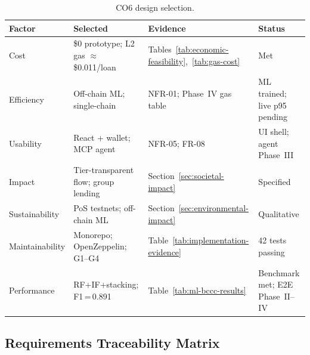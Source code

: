 \documentclass[12pt,a4paper]{report}
\newcommand{\tableheadcolor}{\rowcolor{TableHeadBg}}
\begin{document}
\begin{table}[H]
\centering
\caption[CO6 design selection]{CO6 design selection.}
\label{tab:co6-selection-summary}
\small
\begin{tabular}{@{}p{2.2cm}p{3.6cm}p{4.0cm}p{4.4cm}@{}}
\toprule
\tableheadcolor
\textbf{Factor} & \textbf{Selected} & \textbf{Evidence} & \textbf{Status} \\
\midrule
Cost & \$0 prototype; L2 gas ${\approx}$\$0.011/loan & Tables~\ref{tab:economic-feasibility},~\ref{tab:gas-cost} & Met \\
Efficiency & Off-chain ML; single-chain & NFR-01; Phase~IV gas table & ML trained; live p95 pending \\
Usability & React + wallet; MCP agent & NFR-05; FR-08 & UI shell; agent Phase~III \\
Impact & Tier-transparent flow; group lending & Section~\ref{sec:societal-impact} & Specified \\
Sustainability & PoS testnets; off-chain ML & Section~\ref{sec:environmental-impact} & Qualitative \\
Maintainability & Monorepo; OpenZeppelin; G1--G4 & Table~\ref{tab:implementation-evidence} & 42 tests passing \\
Performance & RF+IF+stacking; F1\,=\,0.891 & Table~\ref{tab:ml-bccc-results} & Benchmark met; E2E Phase~II--IV \\
\bottomrule
\end{tabular}
\end{table}

\subsection{Requirements Traceability Matrix}
\label{sec:traceability}
\end{document}
